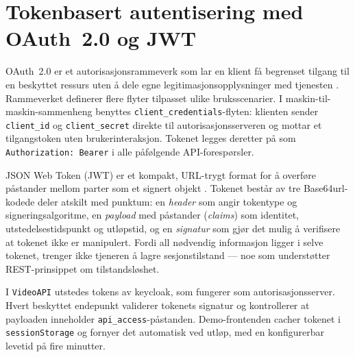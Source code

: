 


\section{Tokenbasert autentisering med OAuth~2.0 og JWT}
\label{sec:token-autentisering-oauth-jwt}
OAuth~2.0 er et autorisasjonsrammeverk som lar en klient få begrenset tilgang til en beskyttet ressurs uten å dele egne legitimasjonsopplysninger med tjenesten \cite{rfc6749}. Rammeverket definerer flere flyter tilpasset ulike bruksscenarier. I maskin-til-maskin-sammenheng benyttes \texttt{client\_credentials}-flyten: klienten sender \texttt{client\_id} og \texttt{client\_secret} direkte til autorisasjonsserveren og mottar et tilgangstoken uten brukerinteraksjon. Tokenet legges deretter på som \texttt{Authorization: Bearer} i alle påfølgende API-forespørsler.

JSON Web Token (JWT) er et kompakt, URL-trygt format for å overføre påstander mellom parter som et signert objekt \cite{rfc7519}. Tokenet består av tre Base64url-kodede deler atskilt med punktum: en \emph{header} som angir tokentype og signeringsalgoritme, en \emph{payload} med påstander (\emph{claims}) som identitet, utstedelsestidspunkt og utløpstid, og en \emph{signatur} som gjør det mulig å verifisere at tokenet ikke er manipulert. Fordi all nødvendig informasjon ligger i selve tokenet, trenger ikke tjeneren å lagre sesjonstilstand — noe som understøtter REST-prinsippet om tilstandsløshet.

I \texttt{VideoAPI} utstedes tokens av \gls{keycloak}, som fungerer som autorisasjonsserver. Hvert beskyttet endepunkt validerer tokenets signatur og kontrollerer at payloaden inneholder \texttt{api\_access}-påstanden. Demo-frontenden cacher tokenet i \texttt{sessionStorage} og fornyer det automatisk ved utløp, med en konfigurerbar levetid på fire minutter.